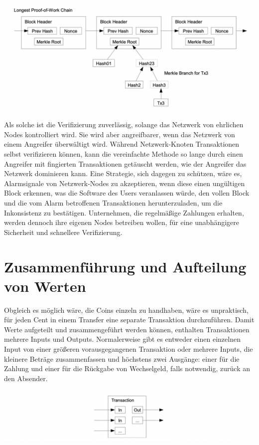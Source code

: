 \documentclass[9pt]{article}
\begin{document}
	\begin{center}
		\includegraphics[scale=0.35]{pics/spv.png}
	\end{center}
	
	Als solche ist die Verifizierung zuverlässig, solange das Netzwerk von ehrlichen Nodes kontrolliert wird. Sie wird aber angreifbarer, wenn das Netzwerk von einem Angreifer überwältigt wird. Während Netzwerk-Knoten Transaktionen selbst verifizieren können, kann die vereinfachte Methode so lange durch einen Angreifer mit fingierten Transaktionen getäuscht werden, wie der Angreifer das Netzwerk dominieren kann. Eine Strategie, sich dagegen zu schützen, wäre es, Alarmsignale von Netzwerk-Nodes zu akzeptieren, wenn diese einen ungültigen Block erkennen, was die Software des Users veranlassen würde, den vollen Block und die vom Alarm betroffenen Transaktionen herunterzuladen, um die Inkonsistenz zu bestätigen. Unternehmen, die regelmäßige Zahlungen erhalten, werden dennoch ihre eigenen Nodes betreiben wollen, für eine unabhängigere Sicherheit und schnellere Verifizierung.

	\section{Zusammenführung und Aufteilung von Werten}
	
	Obgleich es möglich wäre, die Coins einzeln zu handhaben, wäre es unpraktisch, für jeden Cent in einem Transfer eine separate Transaktion durchzuführen. Damit Werte aufgeteilt und zusammengeführt werden können, enthalten Transaktionen mehrere Inputs und Outputs. Normalerweise gibt es entweder einen einzelnen Input von einer größeren vorausgegangenen Transaktion oder mehrere Inputs, die kleinere Beträge zusammenfassen und höchstens zwei Ausgänge: einer für die Zahlung und einer für die Rückgabe von Wechselgeld, falls notwendig, zurück an den Absender.
	
	\begin{center}
		\includegraphics[scale=0.4]{pics/combineandsplit.png}
	\end{center}
	
\end{document}
